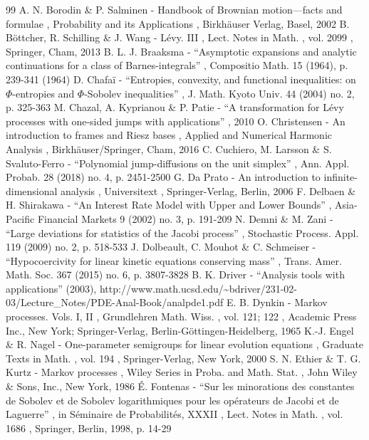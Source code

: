 \documentclass[11pt]{article}
\numberwithin{equation}{section}
\begin{document}
\begin{thebibliography}{99}
 A. N. Borodin \& P. Salminen - Handbook of Brownian motion—facts and formulae , Probability and its Applications , Birkhäuser Verlag, Basel, 2002
 B. Böttcher, R. Schilling \& J. Wang - Lévy. III , Lect. Notes in Math. , vol. 2099 , Springer, Cham, 2013
 B. L. J. Braaksma - “Asymptotic expansions and analytic continuations for a class of Barnes-integrals” , Compositio Math. 15 (1964), p. 239-341 (1964)
 D. Chafaï - “Entropies, convexity, and functional inequalities: on $\Phi $-entropies and $\Phi $-Sobolev inequalities” , J. Math. Kyoto Univ. 44 (2004) no. 2, p. 325-363
 M. Chazal, A. Kyprianou \& P. Patie - “A transformation for Lévy processes with one-sided jumps with applications” , 2010
 O. Christensen - An introduction to frames and Riesz bases , Applied and Numerical Harmonic Analysis , Birkhäuser/Springer, Cham, 2016
 C. Cuchiero, M. Larsson \& S. Svaluto-Ferro - “Polynomial jump-diffusions on the unit simplex” , Ann. Appl. Probab. 28 (2018) no. 4, p. 2451-2500
 G. Da Prato - An introduction to infinite-dimensional analysis , Universitext , Springer-Verlag, Berlin, 2006
 F. Delbaen \& H. Shirakawa - “An Interest Rate Model with Upper and Lower Bounds” , Asia-Pacific Financial Markets 9 (2002) no. 3, p. 191-209
 N. Demni \& M. Zani - “Large deviations for statistics of the Jacobi process” , Stochastic Process. Appl. 119 (2009) no. 2, p. 518-533
 J. Dolbeault, C. Mouhot \& C. Schmeiser - “Hypocoercivity for linear kinetic equations conserving mass” , Trans. Amer. Math. Soc. 367 (2015) no. 6, p. 3807-3828
 B. K. Driver - “Analysis tools with applications” (2003), http://www.math.ucsd.edu/\textasciitilde{}bdriver/231-02-03/Lecture\_Notes/PDE-Anal-Book/analpde1.pdf
 E. B. Dynkin - Markov processes. Vols. I, II , Grundlehren Math. Wiss. , vol. 121; 122 , Academic Press Inc., New York; Springer-Verlag, Berlin-Göttingen-Heidelberg, 1965
 K.-J. Engel \& R. Nagel - One-parameter semigroups for linear evolution equations , Graduate Texts in Math. , vol. 194 , Springer-Verlag, New York, 2000
 S. N. Ethier \& T. G. Kurtz - Markov processes , Wiley Series in Proba. and Math. Stat. , John Wiley \& Sons, Inc., New York, 1986
 É. Fontenas - “Sur les minorations des constantes de Sobolev et de Sobolev logarithmiques pour les opérateurs de Jacobi et de Laguerre” , in Séminaire de Probabilités, XXXII , Lect. Notes in Math. , vol. 1686 , Springer, Berlin, 1998, p. 14-29

\end{thebibliography}
\end{document}
